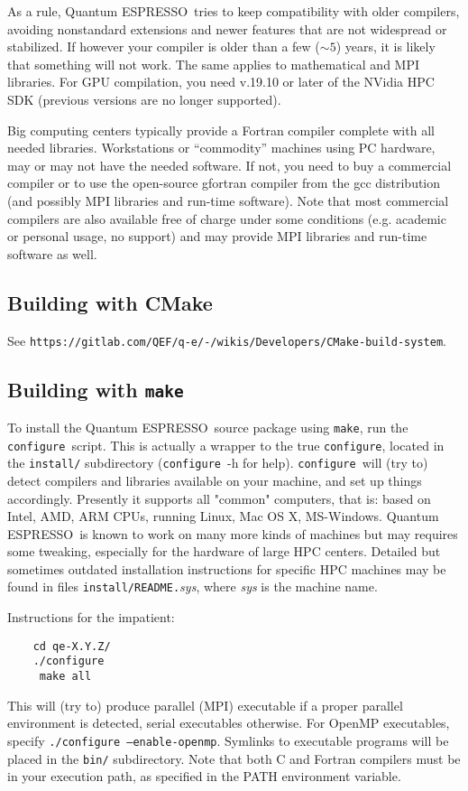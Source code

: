 \documentclass[12pt,a4paper]{article}
\def\qe{{\sc Quantum ESPRESSO}}
\def\configure{\texttt{configure}}
\def\make{\texttt{make}}
\begin{document}
As a rule, \qe\ tries to keep compatibility with older compilers,
avoiding nonstandard extensions and newer features that are not
widespread or stabilized. If however your compiler is older than
a few ($\sim 5$) years, it is likely that something will not work.
The same applies to mathematical and MPI libraries.
For GPU compilation, you need v.19.10 or later of the NVidia HPC SDK
(previous versions are no longer supported).

Big computing centers typically provide a Fortran compiler complete
with all needed libraries. Workstations or ``commodity'' machines
using PC hardware, may or may not have the needed software. If not,
you need to buy a commercial compiler or to use the open-source gfortran
compiler from the gcc distribution (and possibly MPI libraries and run-time
software). Note that most commercial compilers are also available
free of charge under some conditions (e.g. academic or personal usage, no
support) and may provide MPI libraries and run-time software as well.

\subsection{Building with CMake}

See \texttt{https://gitlab.com/QEF/q-e/-/wikis/Developers/CMake-build-system}.

\subsection{Building with \make}

To install the \qe\ source package using \make, run the \configure{}ript. This is actually a wrapper to the true \configure,
located in the \texttt{install/} subdirectory (\configure\ -h for help).
\configure\ will (try to) detect compilers and libraries available on
your machine, and set up things accordingly. Presently it supports
all "common" computers, that is: based on Intel, AMD, ARM CPUs,
running Linux, Mac OS X, MS-Windows. \qe\ is known to work on many
more kinds of machines but may requires some tweaking, especially for
the hardware of large HPC centers. Detailed but sometimes outdated
installation instructions for specific HPC machines may be found in
files \texttt{install/README.}{\em sys}, where {\em sys} is the machine name.

Instructions for the impatient:
\begin{verbatim}
    cd qe-X.Y.Z/
    ./configure
     make all
\end{verbatim}
This will (try to) produce parallel (MPI) executable if a proper parallel
environment is detected, serial executables otherwise. For OpenMP executables,
specify \texttt{./configure --enable-openmp}. Symlinks to executable programs
will be placed in the \texttt{bin/}
subdirectory. Note that both C and Fortran compilers must be in your execution
path, as specified in the PATH environment variable.
\end{document}
